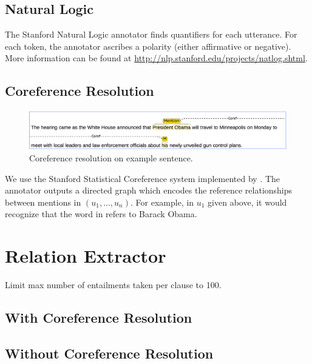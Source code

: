 \subsection{Natural Logic}
The Stanford Natural Logic annotator finds
quantifiers for each utterance. For each token,
the annotator ascribes a polarity (either affirmative
or negative).
More information can be found at 
\url{http://nlp.stanford.edu/projects/natlog.shtml}.
\subsection{Coreference Resolution}

\begin{figure}
\includegraphics[scale=0.33]{figures/coref.png}
\caption{
\label{fig:coref}
Coreference resolution on example sentence.
}
\end{figure}

We use the Stanford Statistical Coreference system implemented by
\citet{clark2015coref}. The annotator outputs a directed graph
which encodes the reference relationships between mentions in 
$(u_1,\dots,u_n)$. For example, in $u_1$ given above, it would
recognize that the word  in 
refers to Barack Obama.

\section{Relation Extractor}
Limit max number of entailments taken per clause to 100.
\citet{angeli2015openie}
\citet{fader11reverb}

\subsection{With Coreference Resolution}

\subsection{Without Coreference Resolution}
